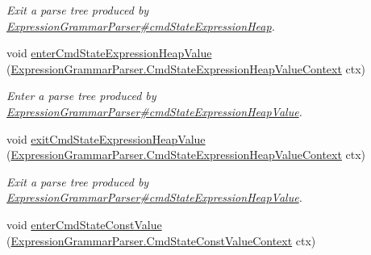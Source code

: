 \begin{DoxyCompactItemize}
\begin{DoxyCompactList}\small\item\em Exit a parse tree produced by \hyperlink{classgov_1_1nasa_1_1jpf_1_1inspector_1_1server_1_1expression_1_1parser_1_1_expression_grammar_parser_a5b90970e937c56fb82d43184d3d4d763}{Expression\+Grammar\+Parser\#cmd\+State\+Expression\+Heap}. \end{DoxyCompactList}\item 
void \hyperlink{interfacegov_1_1nasa_1_1jpf_1_1inspector_1_1server_1_1expression_1_1parser_1_1_expression_grammar_listener_a9989148d56640d21d333bb20059d96f8}{enter\+Cmd\+State\+Expression\+Heap\+Value} (\hyperlink{classgov_1_1nasa_1_1jpf_1_1inspector_1_1server_1_1expression_1_1parser_1_1_expression_grammar_pa975e8909fcf76b653e93728b8bf729a1}{Expression\+Grammar\+Parser.\+Cmd\+State\+Expression\+Heap\+Value\+Context} ctx)
\begin{DoxyCompactList}\small\item\em Enter a parse tree produced by \hyperlink{classgov_1_1nasa_1_1jpf_1_1inspector_1_1server_1_1expression_1_1parser_1_1_expression_grammar_parser_acdd2121f4c72d731261a0733e15bcfe6}{Expression\+Grammar\+Parser\#cmd\+State\+Expression\+Heap\+Value}. \end{DoxyCompactList}\item 
void \hyperlink{interfacegov_1_1nasa_1_1jpf_1_1inspector_1_1server_1_1expression_1_1parser_1_1_expression_grammar_listener_a8e50315613e9b96e4f9e3b7fa1db8e7a}{exit\+Cmd\+State\+Expression\+Heap\+Value} (\hyperlink{classgov_1_1nasa_1_1jpf_1_1inspector_1_1server_1_1expression_1_1parser_1_1_expression_grammar_pa975e8909fcf76b653e93728b8bf729a1}{Expression\+Grammar\+Parser.\+Cmd\+State\+Expression\+Heap\+Value\+Context} ctx)
\begin{DoxyCompactList}\small\item\em Exit a parse tree produced by \hyperlink{classgov_1_1nasa_1_1jpf_1_1inspector_1_1server_1_1expression_1_1parser_1_1_expression_grammar_parser_acdd2121f4c72d731261a0733e15bcfe6}{Expression\+Grammar\+Parser\#cmd\+State\+Expression\+Heap\+Value}. \end{DoxyCompactList}\item 
void \hyperlink{interfacegov_1_1nasa_1_1jpf_1_1inspector_1_1server_1_1expression_1_1parser_1_1_expression_grammar_listener_aab7d8a4a13205c8ea9d96855e16eed81}{enter\+Cmd\+State\+Const\+Value} (\hyperlink{classgov_1_1nasa_1_1jpf_1_1inspector_1_1server_1_1expression_1_1parser_1_1_expression_grammar_pa618023edddc6cf63ca4452111d0560c6}{Expression\+Grammar\+Parser.\+Cmd\+State\+Const\+Value\+Context} ctx)

\end{DoxyCompactItemize}
